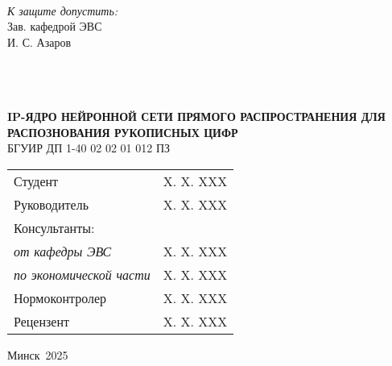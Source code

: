 \newcommand{\targetYear}{2025}

\newcommand{\studentFull}{X. X. XXX}
\newcommand{\tutorFull}{X. X. XXX}
\newcommand{\headOfDepartment}{И. С. Азаров}
\newcommand{\consultDepart}{X. X. XXX}
\newcommand{\consultEconom}{X. X. XXX}
\newcommand{\normInspect}{X. X. XXX}
\newcommand{\recnspect}{X. X. XXX}
\newcommand{\taskNameFull}{IP-ЯДРО НЕЙРОННОЙ СЕТИ ПРЯМОГО РАСПРОСТРАНЕНИЯ ДЛЯ РАСПОЗНОВАНИЯ РУКОПИСНЫХ ЦИФР}
\newcommand{\docNumber}{БГУИР ДП 1-40 02 02 01 012 ПЗ}
\newcommand{\city}{Минск}


\begin{center}
  \\
  \\
  \\
  \\[2em]

  \\
  \\[1.5em]

  \begin{flushright}
    \textit{К защите допустить:}\\
    Зав. кафедрой ЭВС\\[0.5em]
    \underline{\hspace*{3cm}} \headOfDepartment
  \end{flushright}

  \vfill

  \\
  \\
  \\[1em]
  \textbf{\MakeUppercase{\taskNameFull}}\\[1em]

  \docNumber\\[1em]

  \begin{flushleft}
    \begin{tabular}{ p{} p{} }
      Студент & \studentFull \\[1em]
      Руководитель & \tutorFull \\[1em]
      Консультанты: & \\[0.5em]
      \hspace{0.75cm} \textit{от кафедры ЭВС} & \consultDepart \\[1em]
      \hspace{0.75cm} \textit{по экономической части} & \consultEconom \\[1em]
      Нормоконтролер & \normInspect \\[1em]
      Рецензент & \recnspect \\[1em]
    \end{tabular}
  \end{flushleft}

  \vfill
  {\city~\targetYear}
\end{center}

